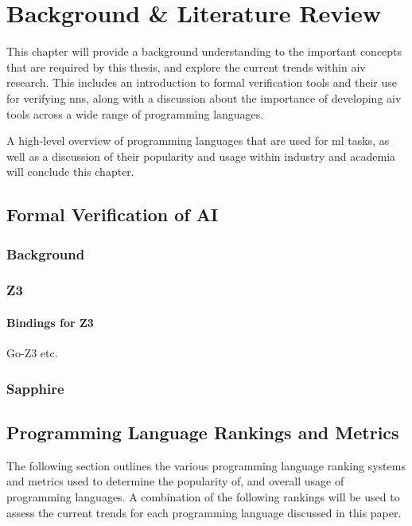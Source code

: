 
\chapter{Background \& Literature Review}\label{Chapter2}


This chapter will provide a background understanding to the important concepts that are required by this thesis, and explore the
current trends within \gls{aiv} research.
This includes an introduction to formal verification tools and their use for verifying \Glspl{nn}, 
along with a discussion about the importance of developing \gls{aiv} tools across a wide range of programming languages.

A high-level overview of programming languages that are used for \gls{ml} tasks, as well
as a discussion of their popularity and usage within industry and academia will conclude this chapter.


\section{Formal Verification of AI}

\subsection{Background}
\subsection{Z3}
\subsubsection{Bindings for Z3}
Go-Z3 etc.

\subsection{Sapphire}

\section{Programming Language Rankings and Metrics}
The following section outlines the various programming language ranking systems and metrics used to
determine the popularity of, and overall usage of programming languages. A combination of the following rankings will
be used to assess the current trends for each programming language discussed in this paper.

